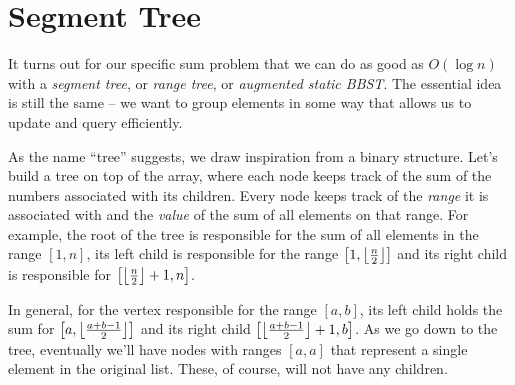 \section{Segment Tree}

It turns out for our specific sum problem that we can do as good as $O(\log{n})$ with a \textit{segment tree}, or \textit{range tree}, or \textit{augmented static BBST}. The essential idea is still the same -- we want to group elements in some way that allows us to update and query efficiently.

As the name ``tree'' suggests, we draw inspiration from a binary structure. Let's build a tree on top of the array, where each node keeps track of the sum of the numbers associated with its children. Every node keeps track of the \textit{range} it is associated with and the \textit{value} of the sum of all elements on that range. For example, the root of the tree is responsible for the sum of all elements in the range $[1, n]$, its left child is responsible for the range $\left[1, \left\lfloor \frac{n}{2} \right\rfloor\right]$ and its right child is responsible for $\left[\left\lfloor \frac{n}{2} \right\rfloor + 1, n\right]$.

In general, for the vertex responsible for the range $[a,b]$, its left child holds the sum for
$\left[a,\left\lfloor \frac{a+b-1}{2} \right\rfloor\right]$ and its right child $\left[\left\lfloor \frac{a+b-1}{2} \right\rfloor+1,b\right]$. As we go down to the tree, eventually we'll have nodes with ranges $[a,a]$ that represent a single element in the original list. These, of course, will not have any children.

